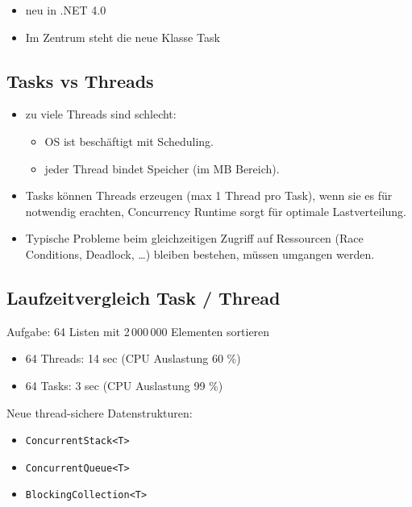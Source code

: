 \begin{itemize}
\item neu in .NET 4.0
\item Im Zentrum steht die neue Klasse Task
\end{itemize}

\subsection{Tasks vs Threads}

\begin{itemize}
\item zu viele Threads sind schlecht:
\begin{itemize}
\item OS ist beschäftigt mit Scheduling.
\item jeder Thread bindet Speicher (im MB Bereich).
\end{itemize}
\item Tasks können Threads erzeugen (max 1 Thread pro Task), wenn sie es für notwendig erachten, Concurrency Runtime sorgt für optimale Lastverteilung.
\item Typische Probleme beim gleichzeitigen Zugriff auf Ressourcen (Race Conditions, Deadlock, …) bleiben bestehen, müssen umgangen werden.
\end{itemize}

\subsection{Laufzeitvergleich Task / Thread}

Aufgabe: 64 Listen mit 2\,000\,000 Elementen sortieren

\begin{itemize}
\item 64 Threads: 14 sec (CPU Auslastung 60 \%)
\item 64 Tasks: 3 sec (CPU Auslastung 99 \%)
\end{itemize}

Neue thread-sichere Datenstrukturen:

\begin{itemize}
\item \lstinline`ConcurrentStack<T>`
\item \lstinline`ConcurrentQueue<T>`
\item \lstinline`BlockingCollection<T>`
\end{itemize}



